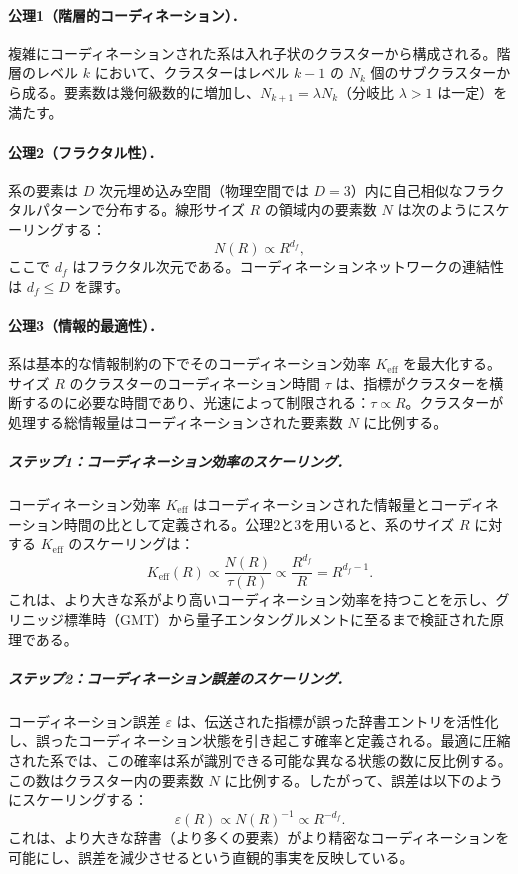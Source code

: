 \documentclass[11pt,a4paper]{article}
\newcommand{\Ke}{K_{\mathrm{eff}}}
\theoremstyle{remark}
\begin{document}
	\paragraph{公理1（階層的コーディネーション）．}
	複雑にコーディネーションされた系は入れ子状のクラスターから構成される。階層のレベル \(k\) において、クラスターはレベル \(k-1\) の \(N_k\) 個のサブクラスターから成る。要素数は幾何級数的に増加し、\(N_{k+1} = \lambda N_k\)（分岐比 \(\lambda > 1\) は一定）を満たす。
	
	\paragraph{公理2（フラクタル性）．}
	系の要素は \(D\) 次元埋め込み空間（物理空間では \(D = 3\)）内に自己相似なフラクタルパターンで分布する。線形サイズ \(R\) の領域内の要素数 \(N\) は次のようにスケーリングする：
	\begin{equation}
		N(R) \propto R^{d_f},
		\label{eq:fractal_dim}
	\end{equation}
	ここで \(d_f\) はフラクタル次元である。コーディネーションネットワークの連結性は \(d_f \le D\) を課す。
	
	\paragraph{公理3（情報的最適性）．}
	系は基本的な情報制約の下でそのコーディネーション効率 \(\Ke\) を最大化する。サイズ \(R\) のクラスターのコーディネーション時間 \(\tau\) は、指標がクラスターを横断するのに必要な時間であり、光速によって制限される：\(\tau \propto R\)。クラスターが処理する総情報量はコーディネーションされた要素数 \(N\) に比例する。
	
	\subparagraph*{ステップ1：コーディネーション効率のスケーリング．}
	コーディネーション効率 \(\Ke\) はコーディネーションされた情報量とコーディネーション時間の比として定義される。公理2と3を用いると、系のサイズ \(R\) に対する \(\Ke\) のスケーリングは：
	\begin{equation}
		\Ke(R) \propto \frac{N(R)}{\tau(R)} \propto \frac{R^{d_f}}{R} = R^{d_f - 1}.
		\label{eq:keff_scale}
	\end{equation}
	これは、より大きな系がより高いコーディネーション効率を持つことを示し、グリニッジ標準時（GMT）から量子エンタングルメントに至るまで検証された原理である。
	
	\subparagraph*{ステップ2：コーディネーション誤差のスケーリング．}
	コーディネーション誤差 \(\varepsilon\) は、伝送された指標が誤った辞書エントリを活性化し、誤ったコーディネーション状態を引き起こす確率と定義される。最適に圧縮された系では、この確率は系が識別できる可能な異なる状態の数に反比例する。この数はクラスター内の要素数 \(N\) に比例する。したがって、誤差は以下のようにスケーリングする：
	\begin{equation}
		\varepsilon(R) \propto N(R)^{-1} \propto R^{-d_f}.
		\label{eq:error_scale}
	\end{equation}
	これは、より大きな辞書（より多くの要素）がより精密なコーディネーションを可能にし、誤差を減少させるという直観的事実を反映している。
	
\end{document}
